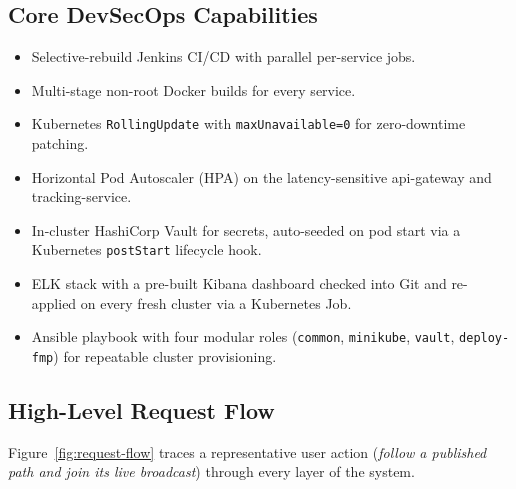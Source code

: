 \documentclass[11pt,a4paper]{article}
\begin{document}
\subsection{Core DevSecOps Capabilities}
\begin{itemize}[leftmargin=*]
  \item Selective-rebuild Jenkins CI/CD with parallel per-service jobs.
  \item Multi-stage non-root Docker builds for every service.
  \item Kubernetes \texttt{RollingUpdate} with
        \texttt{maxUnavailable=0} for zero-downtime patching.
  \item Horizontal Pod Autoscaler (HPA) on the latency-sensitive
        api-gateway and tracking-service.
  \item In-cluster HashiCorp Vault for secrets, auto-seeded on pod
        start via a Kubernetes \texttt{postStart} lifecycle hook.
  \item ELK stack with a pre-built Kibana dashboard checked into Git
        and re-applied on every fresh cluster via a Kubernetes Job.
  \item Ansible playbook with four modular roles
        (\texttt{common}, \texttt{minikube}, \texttt{vault},
        \texttt{deploy-fmp}) for repeatable cluster provisioning.
\end{itemize}

\subsection{High-Level Request Flow}
Figure~\ref{fig:request-flow} traces a representative user action
(\emph{follow a published path and join its live broadcast}) through
every layer of the system.
\end{document}
